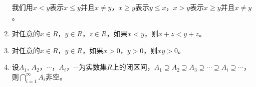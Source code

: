 \documentclass{book}[oneside]
\begin{document}
\begin{CJK*}{UTF8}{gbsn}
\begin{enumerate}
  我们用$x<y$表示$x\leq y$并且$x\neq y$，$x\geq y$表示$y\leq x$，$x > y$表示$x\geq y$并且$x\neq y$。
  
  \item 对任意的$x\in R$，$y\in R$，$z\in R$，如果$x<y$，则$x+z<y+z$。
  \item 对任意的$x\in R$，$y\in R$，如果$x>0$，$y>0$，则$xy>0$。
  \item 设$A_1$, $A_2$，$\cdots$，$A_i$，$\cdots$为实数集$R$上的闭区间，$A_1\supseteq A_2 \supseteq A_3 \supseteq \cdots \supseteq A_i \supseteq \cdots$，则$\bigcap_{i=1}^{\infty}A_i$非空。
  \end{enumerate}



      \chapter{}

\end{CJK*}
\end{document}

